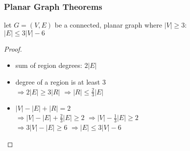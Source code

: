 \documentclass[dvipsnames]{beamer}
\begin{document}
% 

\begin{frame}
  \frametitle{Planar Graph Theorems}

  \begin{theorem}
    let $G=(V,E)$ be a connected, planar graph where $|V| \geq 3$:\\
    $|E| \leq 3 |V| - 6$
  \end{theorem}

  \pause
  \begin{proof}
    \begin{itemize}
      \item sum of region degrees: $2 |E|$

      \pause
      \item degree of a region is at least $3$\\
        \pause
        $\Rightarrow 2 |E| \geq 3 |R|$
        \pause
        $\Rightarrow |R| \leq \frac{2}{3} |E|$

      \pause
      \item $|V| - |E| + |R| = 2$\\
        \pause
        $\Rightarrow |V| - |E| + \frac{2}{3} |E| \geq 2$
        \pause
        $\Rightarrow |V| - \frac{1}{3} |E| \geq 2$\\
        \pause
        $\Rightarrow 3 |V| - |E| \geq 6$
        \pause
        $\Rightarrow |E| \leq 3 |V| - 6$\\
    \end{itemize}
  \end{proof}
\end{frame}
\end{document}
